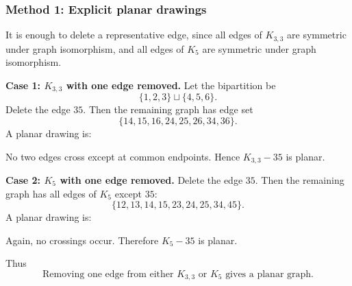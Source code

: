 \documentclass[12pt]{article}
\begin{document}
\subsubsection{Method 1: Explicit planar drawings}
It is enough to delete a representative edge, since all edges of $K_{3,3}$ are symmetric under graph isomorphism, and all edges of $K_5$ are symmetric under graph isomorphism.

\medskip
\noindent\textbf{Case 1: $K_{3,3}$ with one edge removed.}
Let the bipartition be
\[
\{1,2,3\}\sqcup\{4,5,6\}.
\]
Delete the edge $35$. Then the remaining graph has edge set
\[
\{14,15,16,24,25,26,34,36\}.
\]
A planar drawing is:

\begin{center}
\end{center}

No two edges cross except at common endpoints. Hence $K_{3,3}-35$ is planar.

\medskip
\noindent\textbf{Case 2: $K_5$ with one edge removed.}
Delete the edge $35$. Then the remaining graph has all edges of $K_5$ except $35$:
\[
\{12,13,14,15,23,24,25,34,45\}.
\]
A planar drawing is:

\begin{center}
\end{center}
Again, no crossings occur. Therefore $K_5-35$ is planar.

Thus
\[
\boxed{\text{Removing one edge from either }K_{3,3}\text{ or }K_5\text{ gives a planar graph.}}
\]
\end{document}
